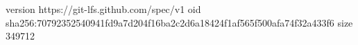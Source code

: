version https://git-lfs.github.com/spec/v1
oid sha256:70792352540941fd9a7d204f16ba2c2d6a18424f1af565f500afa74f32a433f6
size 349712
